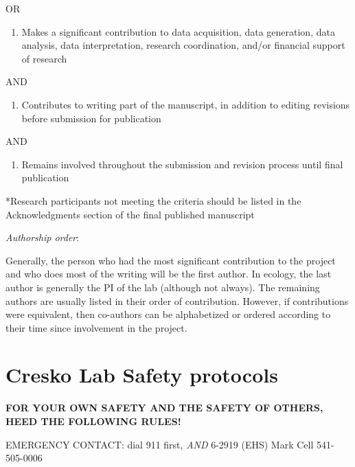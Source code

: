 \documentclass[
]{book}
\providecommand{\tightlist}{%
  \setlength{\itemsep}{0pt}\setlength{\parskip}{0pt}}
\begin{document}
OR

\begin{enumerate}
\def\labelenumi{\arabic{enumi})}
\setcounter{enumi}{1}
\tightlist
\item
  Makes a significant contribution to data acquisition, data generation, data analysis, data
  interpretation, research coordination, and/or financial support of research
\end{enumerate}

AND

\begin{enumerate}
\def\labelenumi{\arabic{enumi})}
\setcounter{enumi}{2}
\tightlist
\item
  Contributes to writing part of the manuscript, in addition to editing revisions before
  submission for publication
\end{enumerate}

AND

\begin{enumerate}
\def\labelenumi{\arabic{enumi})}
\setcounter{enumi}{3}
\tightlist
\item
  Remains involved throughout the submission and revision process until final publication
\end{enumerate}

*Research participants not meeting the criteria should be listed in the Acknowledgments
section of the final published manuscript

\emph{Authorship order}:

Generally, the person who had the most significant contribution to the project and who does
most of the writing will be the first author. In ecology, the last author is generally the PI of the
lab (although not always). The remaining authors are usually listed in their order of
contribution. However, if contributions were equivalent, then co-authors can be alphabetized
or ordered according to their time since involvement in the project.

\hypertarget{cresko-lab-safety-protocols}{%
\chapter{Cresko Lab Safety protocols}\label{cresko-lab-safety-protocols}}

\textbf{FOR YOUR OWN SAFETY AND THE SAFETY OF OTHERS, HEED THE FOLLOWING RULES!}

EMERGENCY CONTACT: dial 911 first, \emph{AND} 6-2919 (EHS) \textbar{} Mark Cell 541-505-0006
\end{document}
